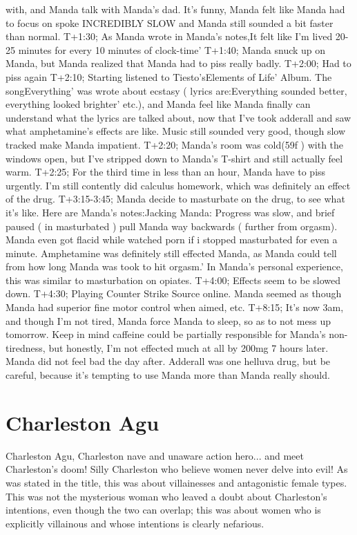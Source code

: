 \documentclass[12pt]{book}
\begin{document}
with, and Manda talk with Manda's dad. It's funny, Manda felt like Manda had to focus on spoke INCREDIBLY SLOW and Manda still sounded a bit faster than normal. T+1:30; As Manda wrote in Manda's notes,It felt like I'm lived 20-25 minutes for every 10 minutes of clock-time' T+1:40; Manda snuck up on Manda, but Manda realized that Manda had to piss really badly. T+2:00; Had to piss again T+2:10; Starting listened to Tiesto'sElements of Life' Album. The songEverything' was wrote about ecstasy ( lyrics are:Everything sounded better, everything looked brighter' etc.), and Manda feel like Manda finally can understand what the lyrics are talked about, now that I've took adderall and saw what amphetamine's effects are like. Music still sounded very good, though slow tracked make Manda impatient. T+2:20; Manda's room was cold(59f ) with the windows open, but I've stripped down to Manda's T-shirt and still actually feel warm. T+2:25; For the third time in less than an hour, Manda have to piss urgently. I'm still contently did calculus homework, which was definitely an effect of the drug. T+3:15-3:45; Manda decide to masturbate on the drug, to see what it's like. Here are Manda's notes:Jacking Manda: Progress was slow, and brief paused ( in masturbated ) pull Manda way backwards ( further from orgasm). Manda even got flacid while watched porn if i stopped masturbated for even a minute. Amphetamine was definitely still effected Manda, as Manda could tell from how long Manda was took to hit orgasm.' In Manda's personal experience, this was similar to masturbation on opiates. T+4:00; Effects seem to be slowed down. T+4:30; Playing Counter Strike Source online. Manda seemed as though Manda had superior fine motor control when aimed, etc. T+8:15; It's now 3am, and though I'm not tired, Manda force Manda to sleep, so as to not mess up tomorrow. Keep in mind caffeine could be partially responsible for Manda's non-tiredness, but honestly, I'm not effected much at all by 200mg 7 hours later. Manda did not feel bad the day after. Adderall was one helluva drug, but be careful, because it's tempting to use Manda more than Manda really should.






\chapter{Charleston Agu}

Charleston Agu, Charleston nave and unaware action hero... and meet Charleston's doom! Silly Charleston who believe women never delve into evil! As was stated in the title, this was about villainesses and antagonistic female types. This was not the mysterious woman who leaved a doubt about Charleston's intentions, even though the two can overlap; this was about women who is explicitly villainous and whose intentions is clearly nefarious.
\end{document}
